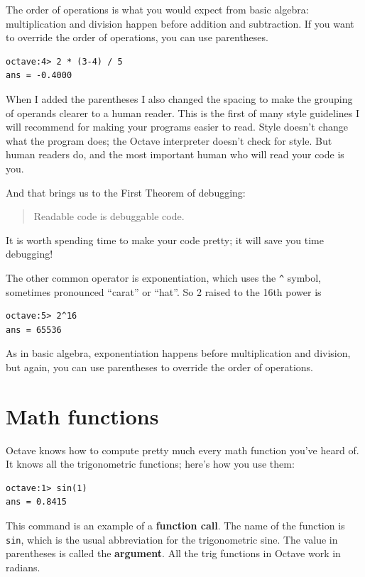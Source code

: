 \documentclass{book}
\begin{document}
The order of operations is what you would expect from basic algebra:
multiplication and division happen before addition and subtraction.
If you want to override the order of operations, you can use parentheses.

\begin{verbatim}
octave:4> 2 * (3-4) / 5
ans = -0.4000
\end{verbatim}

When I added the parentheses I also changed the spacing to make the
grouping of operands clearer to a human reader. This is the first
of many style guidelines I will recommend for making your programs
easier to read. Style doesn't change what the program does; the Octave
interpreter doesn't check for style. But human readers do, and the
most important human who will read your code is you.

And that brings us to the First Theorem of debugging:

\begin{quote}
Readable code is debuggable code.
\end{quote}

It is worth spending time to make your code pretty; it will save
you time debugging!

The other common operator is exponentiation, which uses the \verb+^+
symbol, sometimes pronounced ``carat'' or ``hat''. So 2 raised to the
16th power is

\begin{verbatim}
octave:5> 2^16
ans = 65536
\end{verbatim}

As in basic algebra, exponentiation happens before multiplication
and division, but again, you can use parentheses to override the order
of operations.


\section{Math functions}

Octave knows how to compute pretty much every math function you've
heard of. It knows all the trigonometric functions; here's how you
use them:

\begin{verbatim}
octave:1> sin(1)
ans = 0.8415
\end{verbatim}

This command is an example of a {\bf function call}. The name of the
function is {\tt sin}, which is the usual abbreviation for the
trigonometric sine. The value in parentheses is called the {\bf argument}.
All the trig functions in Octave work in radians.
\end{document}
